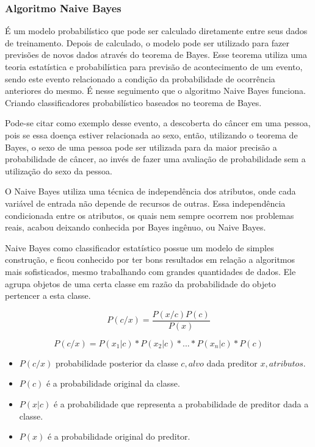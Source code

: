 \subsubsection{Algoritmo Naive Bayes}\label{cap:refTeor:sssec:nbayes}

É um modelo probabilístico que pode ser calculado diretamente entre seus dados de treinamento. Depois de calculado, o modelo pode ser utilizado para fazer previsões de novos dados através do teorema de Bayes. Esse teorema utiliza uma teoria estatística e probabilística para previsão de acontecimento de um evento, sendo este evento  relacionado a condição da probabilidade de ocorrência anteriores do mesmo. É nesse seguimento que o algoritmo Naive Bayes funciona. Criando classificadores  probabilístico baseados no teorema de Bayes.

Pode-se citar como exemplo desse evento, a descoberta do câncer em uma pessoa, pois se essa doença estiver relacionada ao sexo, então, utilizando o teorema de Bayes, o sexo de uma pessoa pode ser utilizada para da maior precisão a probabilidade de câncer, ao invés de fazer uma avaliação de probabilidade sem a utilização do sexo da pessoa.

O Naive Bayes utiliza uma técnica de independência dos atributos, onde cada variável de entrada não depende de recursos de outras. Essa independência condicionada  entre os atributos, os quais nem sempre ocorrem nos problemas reais, acabou deixando conhecida por Bayes ingênuo, ou Naive Bayes.

Naive Bayes como classificador estatístico possue um modelo de simples construção, e ficou conhecido por ter bons resultados em relação a algoritmos mais sofisticados, mesmo trabalhando com grandes quantidades de dados. Ele agrupa objetos de uma certa classe em razão da probabilidade do objeto pertencer a esta classe. 

\begin{equation}
 P(c/x)= \frac{P(x/c)P(c)}{P(x)}
\end{equation}

\begin{equation}
 P(c/x)=P(x_1|c)*P(x_2|c)*...*P(x_n|c)*P(c)
 \label{eq:bayes}
\end{equation}


\begin{itemize}
 \item ${P(c/x)}$ probabilidade posterior da classe ${c,alvo}$ dada preditor ${x,atributos}$.
 \item ${P(c)}$  é a probabilidade original da classe.
 \item ${P(x|c)}$  é a probabilidade que representa a probabilidade de preditor dada a classe.
 \item ${P(x)}$  é a probabilidade original do preditor.
\end{itemize}

